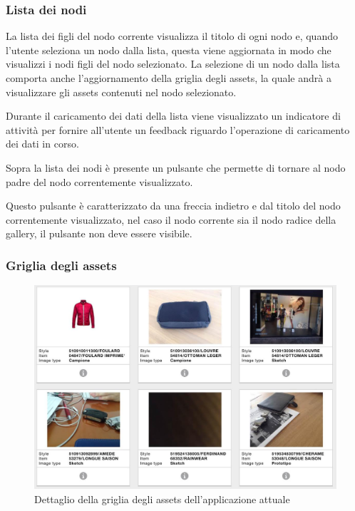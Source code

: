 \subsubsection{Lista dei nodi}


La lista dei figli del nodo corrente visualizza il titolo di ogni nodo e, quando l'utente seleziona un nodo dalla lista, questa viene aggiornata in modo che visualizzi i nodi figli del nodo selezionato. 
La selezione di un nodo dalla lista comporta anche l'aggiornamento della griglia degli assets, la quale andrà a visualizzare gli assets contenuti nel nodo selezionato.

Durante il caricamento dei dati della lista viene visualizzato un indicatore di attività per fornire all'utente un feedback riguardo l'operazione di caricamento dei dati in corso.

Sopra la lista dei nodi è presente un pulsante che permette di tornare al nodo padre del nodo correntemente visualizzato.

Questo pulsante è caratterizzato da una freccia indietro e dal titolo del nodo correntemente visualizzato, nel caso il nodo corrente sia il nodo radice della gallery, il pulsante non deve essere visibile.

\subsubsection{Griglia degli assets}

\begin{figure}[htp]
\centering
\includegraphics[width=\textwidth]{../immagini/warda-gallery-griglia}
\caption{Dettaglio della griglia degli assets dell'applicazione attuale}  
\end{figure}

